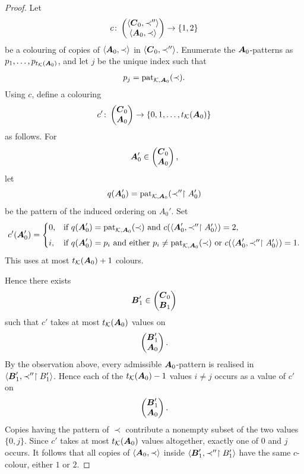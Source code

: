 \begin{proof}
    Let
    \[
        c\colon
        \begin{pmatrix}
            \langle\boldsymbol{C}_0,\prec''\rangle \\
            \langle\boldsymbol{A}_0,\prec\rangle
        \end{pmatrix}
        \to
        \{1,2\}
    \]
    be a colouring of copies of \(\langle\boldsymbol{A}_0,\prec\rangle\) in \(\langle\boldsymbol{C}_0,\prec''\rangle\). Enumerate the \(\boldsymbol{A}_0\)-patterns as \(p_1,\dots,p_{t_{\mathcal{K}}(\boldsymbol{A}_0)}\), and let \(j\) be the unique index such that
    \[
        p_j=\operatorname{pat}_{\mathcal{K},\boldsymbol{A}_0}(\prec).
    \]
    Using \(c\), define a colouring
    \[
        c'\colon
        \begin{pmatrix}\boldsymbol{C}_0\\ \boldsymbol{A}_0\end{pmatrix}
        \to
        \{0,1,\dots,t_{\mathcal{K}}(\boldsymbol{A}_0)\}
    \]
    as follows. For
    \[
        \boldsymbol{A}_0'\in\begin{pmatrix}\boldsymbol{C}_0\\ \boldsymbol{A}_0\end{pmatrix},
    \]
    let
    \[
        q(\boldsymbol{A}_0')
        =
        \operatorname{pat}_{\mathcal{K},\boldsymbol{A}_0}(\prec''\restriction A_0')
    \]
    be the pattern of the induced ordering on \(A_0'\). Set
    \[
        c'(\boldsymbol{A}_0')=
        \begin{cases}
            0, & \text{if }q(\boldsymbol{A}_0')=\operatorname{pat}_{\mathcal{K},\boldsymbol{A}_0}(\prec)
            \text{ and }c(\langle\boldsymbol{A}_0',\prec''\restriction A_0'\rangle)=2,  \\[1ex]
            i, & \text{if }q(\boldsymbol{A}_0')=p_i\text{ and either }
            p_i\neq\operatorname{pat}_{\mathcal{K},\boldsymbol{A}_0}(\prec)
            \text{ or }c(\langle\boldsymbol{A}_0',\prec''\restriction A_0'\rangle)=1.
        \end{cases}
    \]
    This uses at most \(t_{\mathcal{K}}(\boldsymbol{A}_0)+1\) colours.

    Hence there exists
    \[
        \boldsymbol{B}_1'\in\begin{pmatrix}\boldsymbol{C}_0\\ \boldsymbol{B}_1\end{pmatrix}
    \]
    such that \(c'\) takes at most \(t_{\mathcal{K}}(\boldsymbol{A}_0)\) values on
    \[
        \begin{pmatrix}\boldsymbol{B}_1'\\ \boldsymbol{A}_0\end{pmatrix}.
    \]
    By the observation above, every admissible \(\boldsymbol{A}_0\)-pattern is realised
    in \(\langle\boldsymbol{B}_1',\prec''\restriction B_1'\rangle\). Hence each of the
    \(t_{\mathcal{K}}(\boldsymbol{A}_0)-1\) values \(i\neq j\) occurs as a value of \(c'\) on
    \[
        \begin{pmatrix}\boldsymbol{B}_1'\\ \boldsymbol{A}_0\end{pmatrix}.
    \]
    Copies having the pattern of \(\prec\) contribute a nonempty subset of
    the two values \(\{0,j\}\). Since \(c'\) takes at most
    \(t_{\mathcal{K}}(\boldsymbol{A}_0)\) values altogether, exactly one of \(0\) and \(j\) occurs.
    It follows that all copies of \(\langle\boldsymbol{A}_0,\prec\rangle\) inside
    \(\langle\boldsymbol{B}_1',\prec''\restriction B_1'\rangle\) have the same
    \(c\)-colour, either \(1\) or \(2\).


\end{proof}
